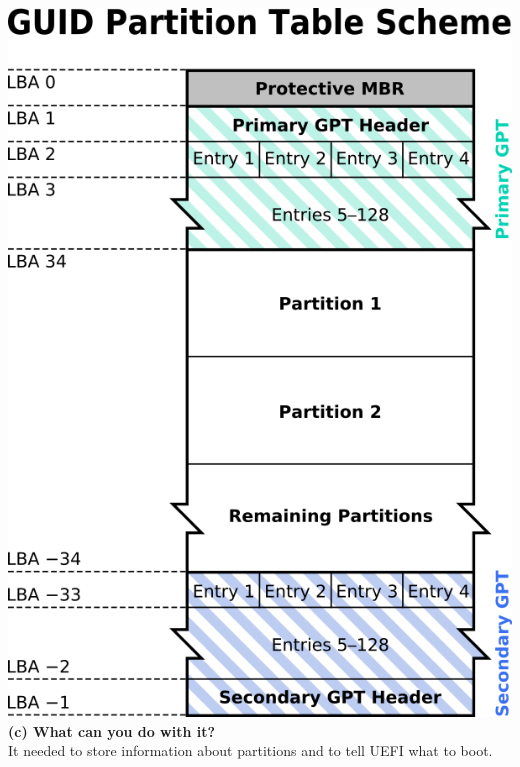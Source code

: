 \documentclass[a4paper,11pt]{article}
\theoremstyle{mytheor}
\begin{document}
\includegraphics{gpt.png}\\
\textbf{(c) What can you do with it?}\\
It needed to store information about partitions and to tell UEFI what to boot.
\end{document}
